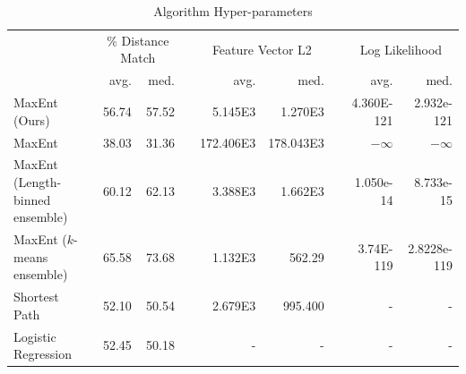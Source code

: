 \documentclass[letterpaper, 10 pt, conference]{ieeeconf}
\begin{document}
\begin{table}[t!]
    
    \centering
    \caption{Algorithm Hyper-parameters}
    \label{tab:results}
    \medskip
    
    {\def\arraystretch{1.2}
        \begin{tabularx}{\textwidth}{X rr c rr c rr}
            
            \toprule
            
            & \multicolumn{2}{c}{\% Distance Match} & \phantom{a} & \multicolumn{2}{c}{Feature Vector L2} & \phantom{a} & \multicolumn{2}{c}{Log Likelihood} \\
            
            \cmidrule{2-3} \cmidrule{5-6} \cmidrule{8-9}
            
            & {avg.} & {med.} & & {avg.} & {med.} & & {avg.} & {med.} \\
            
            \midrule
            
            MaxEnt (Ours) &
            56.74 & 57.52 &  & 5.145E3 & 1.270E3 &  & 4.360E-121 & 2.932e-121 \\
            
            MaxEnt \cite{Ziebart2008} &
            38.03 & 31.36 &  & 172.406E3 & 178.043E3 &  & $-\infty$ & $-\infty$ \\
            
            MaxEnt (Length-binned ensemble) &
            60.12 & 62.13 &  & 3.388E3 & 1.662E3 &  & 1.050e-14 & 8.733e-15 \\
            
            MaxEnt ($k$-means ensemble) &
            65.58 & 73.68 &  & 1.132E3 & 562.29 &  & 3.74E-119 & 2.8228e-119 \\[10pt]
            
            
            Shortest Path &
            52.10 & 50.54 &  & 2.679E3 & 995.400 &  & {-} & {-} \\
            
            Logistic Regression &
            52.45 & 50.18 &  & {-} & {-} &  & {-} & {-} \\
            
            \bottomrule
            
        \end{tabularx}
    }
    
\end{table}
\end{document}
